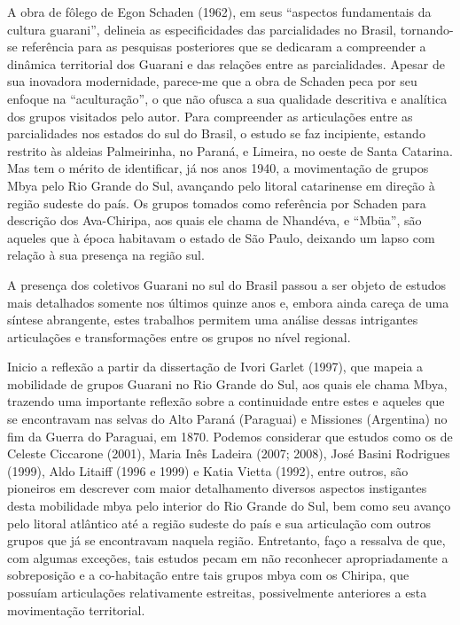 A obra de fôlego de Egon Schaden (1962), em seus ``aspectos fundamentais
da cultura guarani'', delineia as especificidades das parcialidades no
Brasil, tornando-se referência para as pesquisas posteriores que se
dedicaram a compreender a dinâmica territorial dos Guarani e das
relações entre as parcialidades. Apesar de sua inovadora modernidade,
parece-me que a obra de Schaden peca por seu enfoque na ``aculturação'',
o que não ofusca a sua qualidade descritiva e analítica dos grupos
visitados pelo autor. Para compreender as articulações entre as
parcialidades nos estados do sul do Brasil, o estudo se faz incipiente,
estando restrito às aldeias Palmeirinha, no Paraná, e Limeira, no oeste
de Santa Catarina. Mas tem o mérito de identificar, já nos anos 1940, a
movimentação de grupos Mbya pelo Rio Grande do Sul, avançando pelo
litoral catarinense em direção à região sudeste do país. Os grupos
tomados como referência por Schaden para descrição dos Ava-Chiripa, aos
quais ele chama de Nhandéva, e ``Mbüa'', são aqueles que à época
habitavam o estado de São Paulo, deixando um lapso com relação à sua
presença na região sul.

A presença dos coletivos Guarani no sul do Brasil passou a ser objeto de
estudos mais detalhados somente nos últimos quinze anos e, embora ainda
careça de uma síntese abrangente, estes trabalhos permitem uma análise
dessas intrigantes articulações e transformações entre os grupos no
nível regional. 

Inicio a reflexão a partir da dissertação de Ivori Garlet (1997), que
mapeia a mobilidade de grupos Guarani no Rio Grande do Sul, aos quais
ele chama Mbya, trazendo uma importante reflexão sobre a continuidade
entre estes e aqueles que se encontravam nas selvas do Alto Paraná
(Paraguai) e Missiones (Argentina) no fim da Guerra do Paraguai, em
1870. Podemos considerar que estudos como os de Celeste Ciccarone
(2001), Maria Inês Ladeira (2007; 2008), José Basini Rodrigues (1999),
Aldo Litaiff (1996 e 1999) e Katia Vietta (1992), entre outros, são
pioneiros em descrever com maior detalhamento diversos aspectos
instigantes desta mobilidade mbya pelo interior do Rio Grande do Sul,
bem como seu avanço pelo litoral atlântico até a região sudeste do país
e sua articulação com outros grupos que já se encontravam naquela
região. Entretanto, faço a ressalva de que, com algumas exceções, tais
estudos pecam em não reconhecer apropriadamente a sobreposição e a
co-habitação entre tais grupos mbya com os Chiripa, que possuíam
articulações relativamente estreitas, possivelmente anteriores a esta
movimentação territorial.

